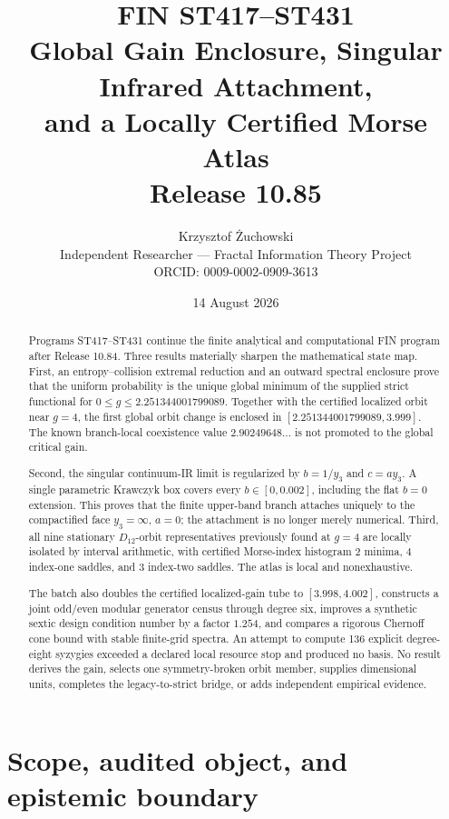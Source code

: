 \documentclass[11pt,a4paper]{article}
\title{\textbf{FIN ST417--ST431}\\[3pt]
Global Gain Enclosure, Singular Infrared Attachment,\\
and a Locally Certified Morse Atlas\\[6pt]
\large Release 10.85}
\author{Krzysztof \.{Z}uchowski\\
\small Independent Researcher --- Fractal Information Theory Project\\
\small ORCID: 0009-0002-0909-3613}
\date{14 August 2026}
\begin{document}
\maketitle

\begin{abstract}
Programs ST417--ST431 continue the finite analytical and computational FIN
program after Release 10.84.  Three results materially sharpen the mathematical
state map.  First, an entropy--collision extremal reduction and an outward
spectral enclosure prove that the uniform probability is the unique global
minimum of the supplied strict functional for
$0\le g\le2.251344001799089$.  Together with the certified localized orbit near
$g=4$, the first global orbit change is enclosed in
$[2.251344001799089,3.999]$.  The known branch-local coexistence value
$2.90249648\ldots$ is not promoted to the global critical gain.

Second, the singular continuum-IR limit is regularized by
$b=1/y_3$ and $c=a y_3$.  A single parametric Krawczyk box covers every
$b\in[0,0.002]$, including the flat $b=0$ extension.  This proves that the
finite upper-band branch attaches uniquely to the compactified face
$y_3=\infty$, $a=0$; the attachment is no longer merely numerical.  Third,
all nine stationary $D_{12}$-orbit representatives previously found at $g=4$
are locally isolated by interval arithmetic, with certified Morse-index
histogram $2$ minima, $4$ index-one saddles, and $3$ index-two saddles.  The
atlas is local and nonexhaustive.

The batch also doubles the certified localized-gain tube to
$[3.998,4.002]$, constructs a joint odd/even modular generator census through
degree six, improves a synthetic sextic design condition number by a factor
$1.254$, and compares a rigorous Chernoff cone bound with stable finite-grid
spectra.  An attempt to compute 136 explicit degree-eight syzygies exceeded a
declared local resource stop and produced no basis.  No result derives the
gain, selects one symmetry-broken orbit member, supplies dimensional units,
completes the legacy-to-strict bridge, or adds independent empirical evidence.
\end{abstract}

\tableofcontents
\newpage

\section{Scope, audited object, and epistemic boundary}
\end{document}
